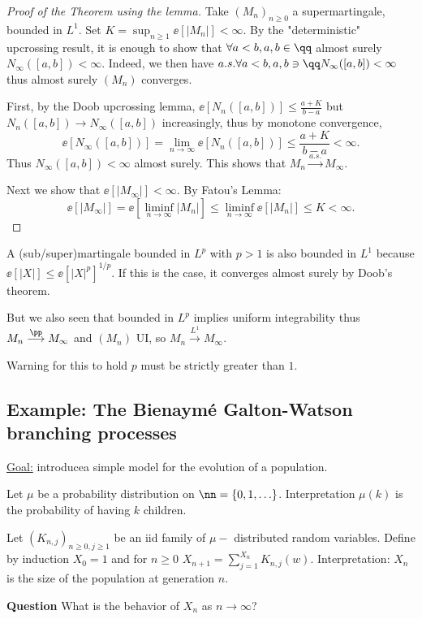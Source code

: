 \documentclass[../main.tex]{subfiles}
\begin{document}
\begin{proof}
  [Proof of the Theorem using the lemma]
  Take $(M_n)_{n \geq 0}$ a supermartingale, bounded in $L^1$. Set $K = \sup_{n
  \geq 1} \ee[|M_n|] < \infty$. By the "deterministic" upcrossing result, it is
  enough to show that $\forall a < b, a, b \in \qq$ almost surely
  $N_{\infty}([a, b])<\infty$. Indeed, we then have $a.s. \forall a < b, a, b
  \ni \qq N_{\infty}([a, b]) < \infty$ thus almost surely $(M_n)$ converges.

  First, by the Doob upcrossing lemma, $\ee[N_n([a, b])] \leq \frac{a + K}{b -a}
  $ but $N_n([a, b]) \to N_{\infty}([a, b])$ increasingly, thus by monotone
  convergence, 
  \[
    \ee[N_{\infty}([a, b])] = \lim_{n \to \infty} \ee[N_{n}([a, b])] \leq
    \frac{a + K}{b - a} < \infty
  .\] 
Thus $N_{\infty}([a, b]) < \infty$ almost surely. This shows that $M_n
  \overset{a.s.}{\longrightarrow} M_{\infty}$.

  Next we show that $\ee[|M_{\infty}|] < \infty$. By Fatou's Lemma:
  \[
    \ee[|M_{\infty}|] = \ee[\liminf_{n \to \infty} |M_n|] \leq \liminf_{n \to
    \infty}\ee[|M_n|] \leq K < \infty
  .\] 
\end{proof} 

\begin{remark}
    A (sub/super)martingale bounded in $L^p$ with $p > 1$ is also bounded in
    $L^1$ because $\ee[|X|] \leq \ee[|X|^p]^{1/p}$. If this is the case, it
    converges almost surely by Doob's theorem. 

    But we also seen that bounded in $L^p$ implies uniform integrability thus 
    $M_n \overset{\pp}{\longrightarrow} M_{\infty}$ and $(M_n)$ UI, so $M_n
    \overset{L^1}{\longrightarrow} M_{\infty}$.

    {\color{red} Warning} for this to hold $p$ must be strictly greater than
    $1$.
\end{remark}

\subsection{Example: The Bienaymé Galton-Watson branching processes}

\underline{Goal:} introducea simple model for the evolution of a population.

Let $\mu$ be a probability distribution on $\nn = \{ 0, 1, \ldots \} $.
Interpretation $\mu(k)$ is the probability of having $k$ children.

Let $(K_{n, j})_{n \geq 0, j \geq 1}$ be an iid family of $\mu-$ distributed
random variables. Define by induction $X_0 = 1$ and for $n \geq 0$ $X_{n+1} =
\sum_{j=1}^{X_n} K_{n, j}(w)$. Interpretation: $X_n$ is the size of the
population at generation $n$.

\vspace{0.5em}
\noindent
\textbf{\sffamily Question}
    What is the behavior of $X_n$ as $n \to \infty$?
\end{document}
